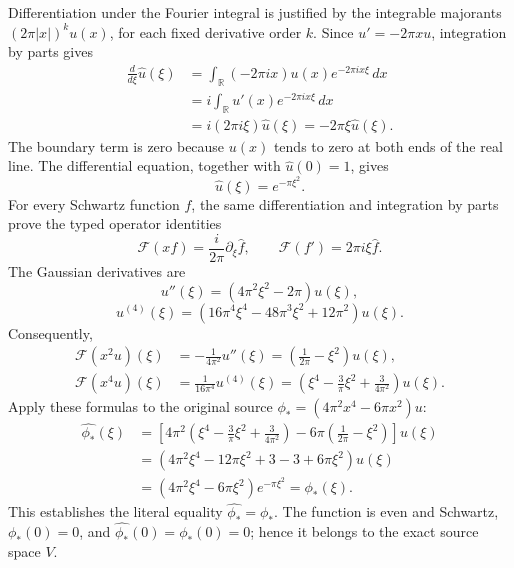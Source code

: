 \documentclass[10pt,a4paper,oneside]{report}
\begin{document}
Differentiation under the Fourier integral is justified by the integrable
majorants \((2\pi|x|)^k u(x)\), for each fixed derivative order \(k\).
Since \(u'=-2\pi xu\), integration by parts gives
\[
\begin{aligned}
\frac{d}{d\xi}\widehat u(\xi)
 &=\int_{\mathbb R}(-2\pi ix)u(x)e^{-2\pi ix\xi}\,dx\\
 &=i\int_{\mathbb R}u'(x)e^{-2\pi ix\xi}\,dx\\
 &=i(2\pi i\xi)\widehat u(\xi)
 =-2\pi\xi\widehat u(\xi).
\end{aligned}
\]
The boundary term is zero because \(u(x)\) tends to zero at both
ends of the real line. The differential equation, together with
\(\widehat u(0)=1\), gives
\[
\widehat u(\xi)=e^{-\pi\xi^2}.
\]
For every Schwartz function \(f\), the same differentiation and integration
by parts prove the typed operator identities
\[
\mathcal F(xf)=\frac{i}{2\pi}\partial_\xi\widehat f,\qquad
\mathcal F(f')=2\pi i\xi\widehat f.
\]
The Gaussian derivatives are
\[
u''(\xi)=(4\pi^2\xi^2-2\pi)u(\xi),
\]
\[
u^{(4)}(\xi)=
(16\pi^4\xi^4-48\pi^3\xi^2+12\pi^2)u(\xi).
\]
Consequently,
\[
\begin{aligned}
\mathcal F(x^2u)(\xi)
 &=-\frac1{4\pi^2}u''(\xi)
   =\left(\frac1{2\pi}-\xi^2\right)u(\xi),\\
\mathcal F(x^4u)(\xi)
 &=\frac1{16\pi^4}u^{(4)}(\xi)
   =\left(\xi^4-\frac3\pi\xi^2+\frac3{4\pi^2}\right)u(\xi).
\end{aligned}
\]
Apply these formulas to the original source
\(\phi_*=(4\pi^2x^4-6\pi x^2)u\):
\[
\begin{aligned}
\widehat{\phi_*}(\xi)
 &=\left[
 4\pi^2\left(\xi^4-\frac3\pi\xi^2+\frac3{4\pi^2}\right)
 -6\pi\left(\frac1{2\pi}-\xi^2\right)\right]u(\xi)\\
 &=(4\pi^2\xi^4-12\pi\xi^2+3-3+6\pi\xi^2)u(\xi)\\
 &=(4\pi^2\xi^4-6\pi\xi^2)e^{-\pi\xi^2}
 =\phi_*(\xi).
\end{aligned}
\]
This establishes the literal equality
\(\widehat{\phi_*}=\phi_*\). The function is even and Schwartz,
\(\phi_*(0)=0\), and
\(\widehat{\phi_*}(0)=\phi_*(0)=0\); hence it belongs to the exact source
space \(V\).
\end{document}
